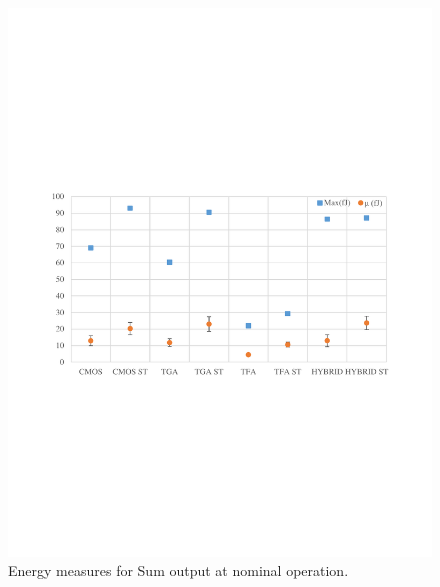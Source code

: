 \documentclass[ecp,tc, english]{iiufrgs}
\begin{document}
\begin{figure}[H]
\centering
\includegraphics[width=\textwidth, trim={0 9cm 0 9cm},clip]{energyNominalSum.pdf}
\caption{Energy measures for Sum output at nominal operation.}
\label{fig:Fig47}
\end{figure}
\end{document}
